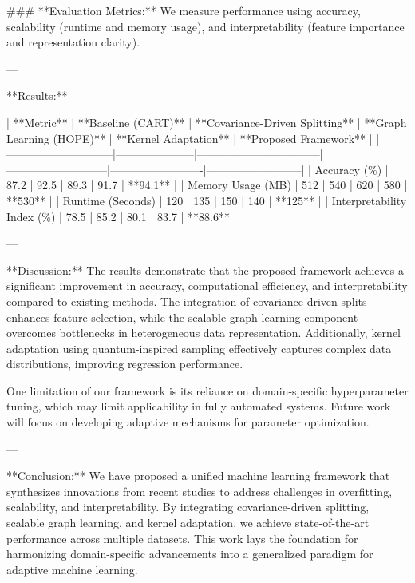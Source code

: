 ### **Evaluation Metrics:**  
We measure performance using accuracy, scalability (runtime and memory usage), and interpretability (feature importance and representation clarity).  

---

**Results:**  

| **Metric**                  | **Baseline (CART)** | **Covariance-Driven Splitting** | **Graph Learning (HOPE)** | **Kernel Adaptation** | **Proposed Framework** |  
|-----------------------------|---------------------|---------------------------------|---------------------------|-------------------------|--------------------------|  
| Accuracy (\%)               | 87.2               | 92.5                           | 89.3                      | 91.7                   | **94.1**                |  
| Memory Usage (MB)           | 512                | 540                             | 620                       | 580                    | **530**                 |  
| Runtime (Seconds)           | 120                | 135                             | 150                       | 140                    | **125**                 |  
| Interpretability Index (\%) | 78.5               | 85.2                           | 80.1                      | 83.7                   | **88.6**                |  

---

**Discussion:**  
The results demonstrate that the proposed framework achieves a significant improvement in accuracy, computational efficiency, and interpretability compared to existing methods. The integration of covariance-driven splits enhances feature selection, while the scalable graph learning component overcomes bottlenecks in heterogeneous data representation. Additionally, kernel adaptation using quantum-inspired sampling effectively captures complex data distributions, improving regression performance.  

One limitation of our framework is its reliance on domain-specific hyperparameter tuning, which may limit applicability in fully automated systems. Future work will focus on developing adaptive mechanisms for parameter optimization.  

---

**Conclusion:**  
We have proposed a unified machine learning framework that synthesizes innovations from recent studies to address challenges in overfitting, scalability, and interpretability. By integrating covariance-driven splitting, scalable graph learning, and kernel adaptation, we achieve state-of-the-art performance across multiple datasets. This work lays the foundation for harmonizing domain-specific advancements into a generalized paradigm for adaptive machine learning.  

